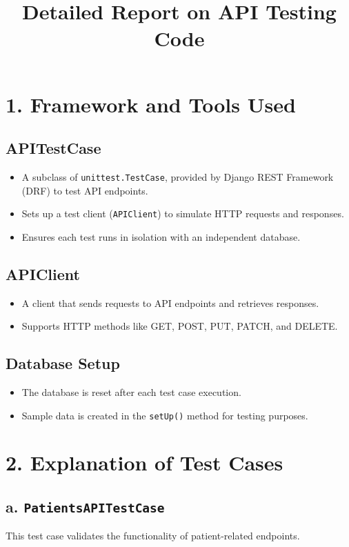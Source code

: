 \documentclass[12pt]{article}
\title{Detailed Report on API Testing Code}
\author{}
\date{}
\begin{document}
\maketitle

\section*{1. Framework and Tools Used}

\subsection*{APITestCase}
\begin{itemize}
    \item A subclass of \texttt{unittest.TestCase}, provided by Django REST Framework (DRF) to test API endpoints.
    \item Sets up a test client (\texttt{APIClient}) to simulate HTTP requests and responses.
    \item Ensures each test runs in isolation with an independent database.
\end{itemize}

\subsection*{APIClient}
\begin{itemize}
    \item A client that sends requests to API endpoints and retrieves responses.
    \item Supports HTTP methods like GET, POST, PUT, PATCH, and DELETE.
\end{itemize}

\subsection*{Database Setup}
\begin{itemize}
    \item The database is reset after each test case execution.
    \item Sample data is created in the \texttt{setUp()} method for testing purposes.
\end{itemize}

\section*{2. Explanation of Test Cases}

\subsection*{a. \texttt{PatientsAPITestCase}}
This test case validates the functionality of patient-related endpoints.
\end{document}
